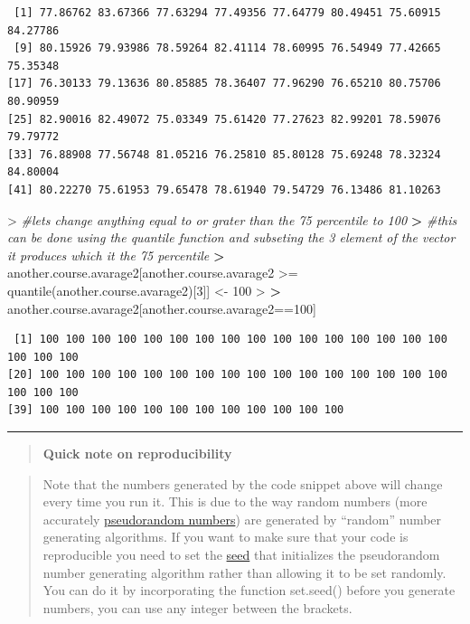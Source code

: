 \documentclass[
]{book}
\newenvironment{Shaded}{\begin{snugshade}}{\end{snugshade}}
\newcommand{\CommentTok}[1]{\textcolor[rgb]{0.56,0.35,0.01}{\textit{#1}}}
\newcommand{\DecValTok}[1]{\textcolor[rgb]{0.00,0.00,0.81}{#1}}
\newcommand{\ErrorTok}[1]{\textcolor[rgb]{0.64,0.00,0.00}{\textbf{#1}}}
\newcommand{\FunctionTok}[1]{\textcolor[rgb]{0.00,0.00,0.00}{#1}}
\newcommand{\NormalTok}[1]{#1}
\newcommand{\OtherTok}[1]{\textcolor[rgb]{0.56,0.35,0.01}{#1}}
\newcommand{\SpecialCharTok}[1]{\textcolor[rgb]{0.00,0.00,0.00}{#1}}
\theoremstyle{definition}
\theoremstyle{definition}
\theoremstyle{definition}
\theoremstyle{definition}
\theoremstyle{remark}
\begin{document}
\begin{verbatim}
 [1] 77.86762 83.67366 77.63294 77.49356 77.64779 80.49451 75.60915 84.27786
 [9] 80.15926 79.93986 78.59264 82.41114 78.60995 76.54949 77.42665 75.35348
[17] 76.30133 79.13636 80.85885 78.36407 77.96290 76.65210 80.75706 80.90959
[25] 82.90016 82.49072 75.03349 75.61420 77.27623 82.99201 78.59076 79.79772
[33] 76.88908 77.56748 81.05216 76.25810 85.80128 75.69248 78.32324 84.80004
[41] 80.22270 75.61953 79.65478 78.61940 79.54729 76.13486 81.10263
\end{verbatim}

\begin{Shaded}
\begin{Highlighting}[]
\SpecialCharTok{\textgreater{}} \CommentTok{\#lets change anything equal to or grater than the 75 percentile to 100}
\ErrorTok{\textgreater{}} \CommentTok{\#this can be done using the quantile function and subseting the 3 element of the vector it produces which it the 75 percentile}
\ErrorTok{\textgreater{}}\NormalTok{ another.course.avarage2[another.course.avarage2 }\SpecialCharTok{\textgreater{}=} \FunctionTok{quantile}\NormalTok{(another.course.avarage2)[}\DecValTok{3}\NormalTok{]] }\OtherTok{\textless{}{-}} \DecValTok{100}
\SpecialCharTok{\textgreater{}} 
\ErrorTok{\textgreater{}}\NormalTok{ another.course.avarage2[another.course.avarage2}\SpecialCharTok{==}\DecValTok{100}\NormalTok{]}
\end{Highlighting}
\end{Shaded}

\begin{verbatim}
 [1] 100 100 100 100 100 100 100 100 100 100 100 100 100 100 100 100 100 100 100
[20] 100 100 100 100 100 100 100 100 100 100 100 100 100 100 100 100 100 100 100
[39] 100 100 100 100 100 100 100 100 100 100 100 100
\end{verbatim}

\begin{center}\rule{0.5\linewidth}{0.5pt}\end{center}

\begin{quote}
\textbf{Quick note on reproducibility}
\end{quote}

\begin{quote}
Note that the numbers generated by the code snippet above will change every time you run it.
This is due to the way random numbers (more accurately \href{https://en.wikipedia.org/wiki/Pseudorandom_number_generator}{pseudorandom numbers}) are generated by ``random'' number generating
algorithms.
If you want to make sure that your code is reproducible you need to set the \href{https://en.wikipedia.org/wiki/Random_seed}{seed} that initializes the pseudorandom number generating algorithm rather than allowing it to be set randomly.
You can do it by incorporating the function set.seed() before you generate numbers, you can use any integer between
the brackets.
\end{quote}
\end{document}
